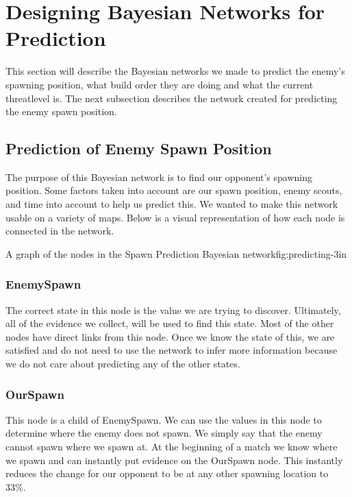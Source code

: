\section{Designing Bayesian Networks for Prediction}\label{bayesian_network}
This section will describe the Bayesian networks we made to predict the enemy's spawning position, what build order they are doing and what the current 
threatlevel is. The next subsection describes the network created for predicting the enemy spawn position.

\subsection{Prediction of Enemy Spawn Position}			 
			
The purpose of this Bayesian network is to find our opponent's spawning position. Some factors taken into account are our spawn position, enemy scouts, and time into account to help us predict this. We wanted to make this network usable on a variety of maps. Below is a visual representation of how each node is connected in the network.

			{A graph of the nodes in the Spawn Prediction Bayesian network}{fig:predicting}{-3in}


\subsubsection*{EnemySpawn}
The correct state in this node is the value we are trying to discover. Ultimately, all of the evidence we collect, will be used to find this state. Most of the other nodes have direct links from this node. Once we know the state of this, we are satisfied and do not need to use the network to infer more information because we do not care about predicting any of the other states.

\subsubsection*{OurSpawn}
This node is a child of EnemySpawn. We can use the values in this node to determine where the enemy does not spawn. We simply say that the enemy cannot spawn where we spawn at. At the beginning of a match we know where we spawn and can instantly put evidence on the OurSpawn node. This instantly reduces the change for our opponent to be at any other spawning location to 33\%.

